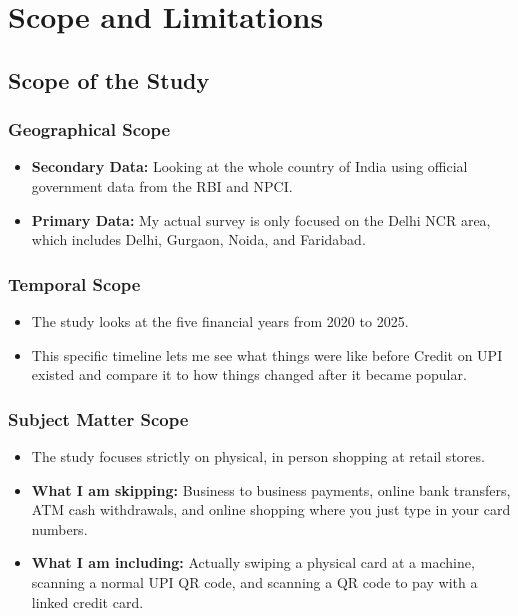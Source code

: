 \chapter{Scope and Limitations}

\section{Scope of the Study}

\subsection{Geographical Scope}

\begin{itemize}
    \item \textbf{Secondary Data:} Looking at the whole country of India using official government data from the RBI and NPCI.
    \item \textbf{Primary Data:} My actual survey is only focused on the Delhi NCR area, which includes Delhi, Gurgaon, Noida, and Faridabad.
\end{itemize}

\subsection{Temporal Scope}

\begin{itemize}
    \item The study looks at the five financial years from 2020 to 2025.
    \item This specific timeline lets me see what things were like before Credit on UPI existed and compare it to how things changed after it became popular.
\end{itemize}

\subsection{Subject Matter Scope}

\begin{itemize}
    \item The study focuses strictly on physical, in person shopping at retail stores.
    \item \textbf{What I am skipping:} Business to business payments, online bank transfers, ATM cash withdrawals, and online shopping where you just type in your card numbers.
    \item \textbf{What I am including:} Actually swiping a physical card at a machine, scanning a normal UPI QR code, and scanning a QR code to pay with a linked credit card.
\end{itemize}

